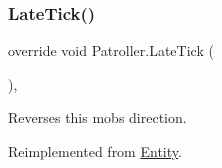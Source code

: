 \subsubsection{\texorpdfstring{Late\+Tick()}{LateTick()}}
{\footnotesize\ttfamily override void Patroller.\+Late\+Tick (\begin{DoxyParamCaption}{ }\end{DoxyParamCaption})\hspace{0.3cm}{\ttfamily [inline]}, {\ttfamily [virtual]}}



Reverses this mob\textquotesingle{}s direction. 



Reimplemented from \mbox{\hyperlink{class_entity_a80e2936e1d8d8590dc183b2980fcd3c9}{Entity}}.

